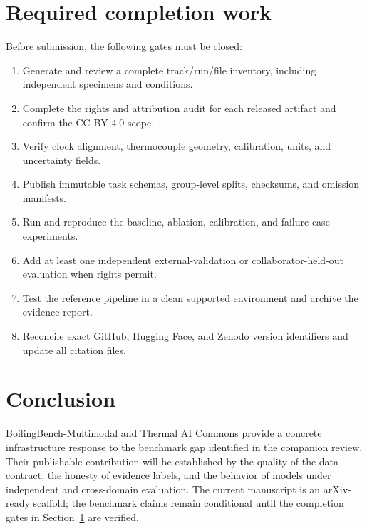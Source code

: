 \documentclass[11pt]{article}
\begin{document}
\section{Required completion work}
\label{sec:remaining}

Before submission, the following gates must be closed:
\begin{enumerate}
  \item Generate and review a complete track/run/file inventory, including independent specimens and conditions.
  \item Complete the rights and attribution audit for each released artifact and confirm the CC BY 4.0 scope.
  \item Verify clock alignment, thermocouple geometry, calibration, units, and uncertainty fields.
  \item Publish immutable task schemas, group-level splits, checksums, and omission manifests.
  \item Run and reproduce the baseline, ablation, calibration, and failure-case experiments.
  \item Add at least one independent external-validation or collaborator-held-out evaluation when rights permit.
  \item Test the reference pipeline in a clean supported environment and archive the evidence report.
  \item Reconcile exact GitHub, Hugging Face, and Zenodo version identifiers and update all citation files.
\end{enumerate}

\section{Conclusion}

BoilingBench-Multimodal and Thermal AI Commons provide a concrete infrastructure response to the benchmark gap identified in the companion review. Their publishable contribution will be established by the quality of the data contract, the honesty of evidence labels, and the behavior of models under independent and cross-domain evaluation. The current manuscript is an arXiv-ready scaffold; the benchmark claims remain conditional until the completion gates in Section~\ref{sec:remaining} are verified.
\end{document}
